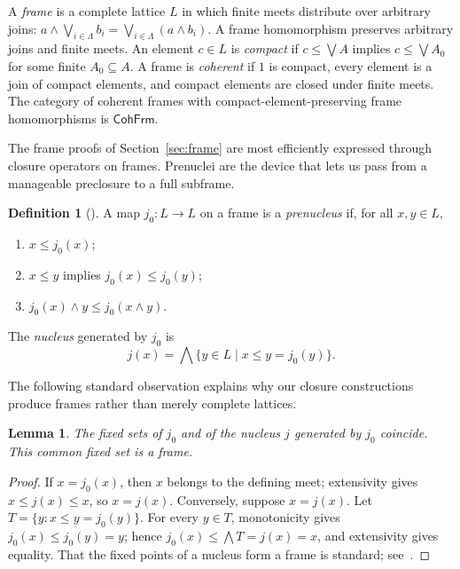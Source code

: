 \documentclass[11pt,leqno]{amsart}
\theoremstyle{plain}
\newtheorem{lemma}[theorem]{Lemma}
\theoremstyle{definition}
\newtheorem{definition}{Definition}[section]
\theoremstyle{remark}
\numberwithin{equation}{section}
\begin{document}
A \emph{frame} is a complete lattice $L$ in which finite meets
distribute over arbitrary joins:
$a\wedge\bigvee_{i\in\Lambda}b_i=\bigvee_{i\in\Lambda}(a\wedge b_i)$.
A frame homomorphism preserves arbitrary joins and finite meets.
An element $c\in L$ is \emph{compact} if $c\leqslant\bigvee A$ implies
$c\leqslant\bigvee A_0$ for some finite $A_0\subseteq A$.
A frame is \emph{coherent} if $1$ is compact, every element is a join
of compact elements, and compact elements are closed under finite meets.
The category of coherent frames with compact-element-preserving frame
homomorphisms is $\mathsf{CohFrm}$.

The frame proofs of Section~\ref{sec:frame} are most efficiently
expressed through closure operators on frames.
Prenuclei are the device that lets us pass from a manageable
preclosure to a full subframe.

\begin{definition}[\cite{Banaschewski88,Johnstone}]
A map $j_0:L\to L$ on a frame is a \emph{prenucleus} if,
for all $x,y\in L$,
\begin{enumerate}
\item $x\leqslant j_0(x)$;
\item $x\leqslant y$ implies $j_0(x)\leqslant j_0(y)$;
\item $j_0(x)\wedge y\leqslant j_0(x\wedge y)$.
\end{enumerate}
The \emph{nucleus} generated by $j_0$ is
\[
j(x)=\bigwedge\{y\in L\mid x\leqslant y=j_0(y)\}.
\]
\end{definition}

The following standard observation explains why our closure
constructions produce frames rather than merely complete lattices.

\begin{lemma}\label{lem:prenucleus-fixed}
The fixed sets of $j_0$ and of the nucleus $j$ generated by $j_0$
coincide.  This common fixed set is a frame.
\end{lemma}
\begin{proof}
If $x=j_0(x)$, then $x$ belongs to the defining meet; extensivity
gives $x\leqslant j(x)\leqslant x$, so $x=j(x)$.
Conversely, suppose $x=j(x)$.  Let $T=\{y:x\leqslant y=j_0(y)\}$.
For every $y\in T$, monotonicity gives $j_0(x)\leqslant j_0(y)=y$;
hence $j_0(x)\leqslant\bigwedge T=j(x)=x$, and extensivity gives
equality.  That the fixed points of a nucleus form a frame is
standard; see~\cite[Ch.~II, Lem.~2.2]{Johnstone}.
\end{proof}
\end{document}
